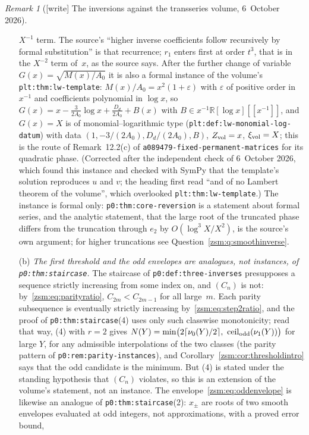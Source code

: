 \documentclass[11pt]{article}
\theoremstyle{definition}\newtheorem{definition}[theorem]{Definition}
\theoremstyle{remark}\newtheorem{remark}[theorem]{Remark}
\newcommand{\R}{\mathbb R}
\newcommand{\ceilodd}{\operatorname{ceil}_{\rm odd}}
\newcommand{\file}[1]{\nolinkurl{#1}}
\begin{document}
\begin{remark}[{[write]} The inversions against the transseries volume, 6~October 2026]
\begin{enumerate}
 $X^{-1}$ term. The source's ``higher inverse coefficients follow
 recursively by formal substitution'' is that recurrence; $r_1$ enters first
 at order $t^3$, that is in the $X^{-2}$ term of~$x$, as the source says.
 After the further change of variable $G(x)=\sqrt{M(x)/A_0}$ it is also a
 formal instance of the volume's \file{plt:thm:lw-template}: $M(x)/A_0=x^2(1+\varepsilon)$
 with $\varepsilon$ of positive order in $x^{-1}$ and coefficients polynomial
 in $\log x$, so $G(x)=x-\frac{3}{2A_0}\log x+\frac{D_d}{2A_0}+B(x)$ with
 $B\in x^{-1}\R[\log x][[x^{-1}]]$, and $G(x)=X$ is of monomial--logarithmic
 type (\file{plt:def:lw-monomial-log-datum}) with data
 $(1,-3/(2A_0),D_d/(2A_0),B)$, $Z_{\rm vol}=x$, $\xi_{\rm vol}=X$; this is
 the route of Remark~12.2(c) of
 \file{a089479-fixed-permanent-matrices} for its quadratic phase.
 \textup{(Corrected after the independent check of 6~October 2026, which
 found this instance and checked with SymPy that the template's solution
 reproduces $u$ and $v$; the heading first read ``and of no Lambert theorem
 of the volume'', which overlooked \file{plt:thm:lw-template}.)}
 The instance is formal only: \file{p0:thm:core-reversion} is a statement
 about formal series, and the analytic statement, that the large root of
 the truncated phase differs from the truncation through $e_2$ by
 $O(\log^3X/X^2)$, is the source's own argument; for higher truncations
 see Question~\ref{zsm:q:smoothinverse}.
\item[(b)] \emph{The first threshold and the odd envelopes are analogues,
 not instances, of \file{p0:thm:staircase}.} The staircase of
 \file{p0:def:three-inverses} presupposes a sequence strictly increasing
 from some index on, and $(C_n)$ is not: by~\eqref{zsm:eq:parityratio},
 $C_{2m}<C_{2m-1}$ for all large~$m$. Each parity subsequence is eventually
 strictly increasing by~\eqref{zsm:eq:step2ratio}, and the proof of
 \file{p0:thm:staircase}(4) uses only such classwise monotonicity; read
 that way, (4) with $r=2$ gives
 $N(Y)=\min\bigl(2\lceil\nu_0(Y)/2\rceil,\ \ceilodd(\nu_1(Y))\bigr)$ for
 large $Y$, for any admissible interpolations of the two classes (the
 parity pattern of \file{p0:rem:parity-instances}), and
 Corollary~\ref{zsm:cor:thresholdintro} says that the odd candidate is the
 minimum. But (4) is stated under the standing hypothesis that $(C_n)$
 violates, so this is an extension of the volume's statement, not an
 instance. The envelope~\eqref{zsm:eq:oddenvelope} is likewise an analogue
 of \file{p0:thm:staircase}(2): $x_\pm$ are roots of two smooth envelopes
 evaluated at odd integers, not approximations, with a proved error bound,

\end{enumerate}
\end{remark}
\end{document}
